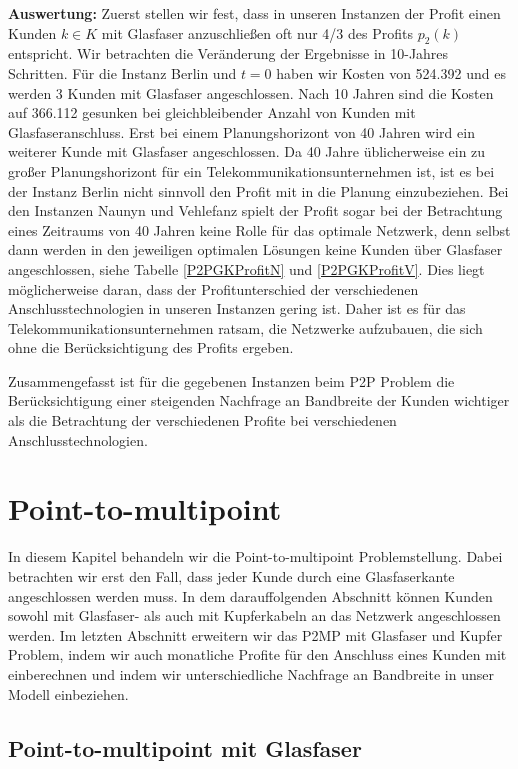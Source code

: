 \documentclass[11pt,a4paper]{article}
\theoremstyle{my_th_style1}
\begin{document}
\textbf{Auswertung:}
Zuerst stellen wir fest, dass in unseren Instanzen der Profit einen Kunden $k \in K$ mit Glasfaser anzuschließen oft nur 4/3 des Profits $p_2(k)$ entspricht. 
Wir betrachten die Veränderung der Ergebnisse in 10-Jahres Schritten.
Für die Instanz Berlin und $t=0$ haben wir Kosten von 524.392 und es werden 3 Kunden mit Glasfaser angeschlossen.
Nach 10 Jahren sind die Kosten auf 366.112 gesunken bei gleichbleibender Anzahl von Kunden mit Glasfaseranschluss.
Erst bei einem Planungshorizont von 40 Jahren wird ein weiterer Kunde mit Glasfaser angeschlossen.
Da 40 Jahre \"ublicherweise ein zu großer Planungshorizont f\"ur ein Telekommunikationsunternehmen ist, ist es bei der Instanz Berlin nicht sinnvoll den Profit mit in die Planung einzubeziehen.
Bei den Instanzen Naunyn und Vehlefanz spielt der Profit sogar bei der Betrachtung eines Zeitraums von 40 Jahren keine Rolle f\"ur das optimale Netzwerk, denn selbst dann werden in den jeweiligen optimalen L\"osungen keine Kunden \"uber Glasfaser angeschlossen, siehe Tabelle \eqref{P2PGKProfitN} und \eqref{P2PGKProfitV}.
Dies liegt m\"oglicherweise daran, dass der Profitunterschied der verschiedenen Anschlusstechnologien in unseren Instanzen gering ist.
Daher ist es f\"ur das Telekommunikationsunternehmen ratsam, die Netzwerke aufzubauen, die sich ohne die Ber\"ucksichtigung des Profits ergeben.

Zusammengefasst ist f\"ur die gegebenen Instanzen beim P2P Problem die Ber\"ucksichtigung einer steigenden Nachfrage an Bandbreite der Kunden wichtiger als die Betrachtung der verschiedenen Profite bei verschiedenen Anschlusstechnologien.

\section{Point-to-multipoint}
In diesem Kapitel behandeln wir die Point-to-multipoint Problemstellung.  Dabei betrachten wir erst den Fall, dass jeder Kunde durch eine Glasfaserkante angeschlossen werden muss. In dem darauffolgenden Abschnitt k\"onnen Kunden sowohl mit Glasfaser- als auch mit Kupferkabeln an das Netzwerk angeschlossen werden. Im letzten Abschnitt erweitern wir das P2MP mit Glasfaser und Kupfer Problem, indem wir auch monatliche Profite f\"ur den Anschluss eines Kunden mit einberechnen und indem wir unterschiedliche Nachfrage an Bandbreite in unser Modell einbeziehen.

 
\subsection{Point-to-multipoint mit Glasfaser}
\label{section_p2mpg} 
 
\end{document}

